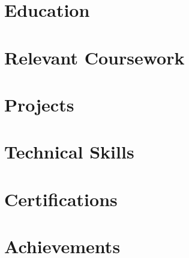\documentclass[letterpaper,11pt]{article}
\begin{document}


\section{Education}


\section{Relevant Coursework}


\section{Projects}


\section{Technical Skills}


\section{Certifications}


\section{Achievements}

\end{document}
